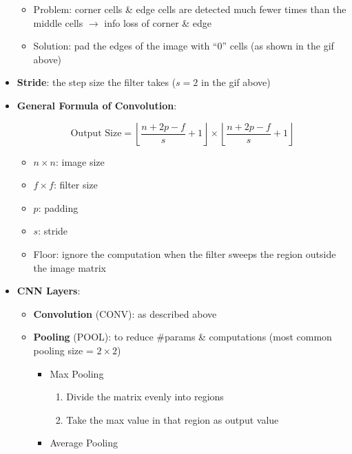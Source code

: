 \documentclass[
]{book}
\providecommand{\tightlist}{%
  \setlength{\itemsep}{0pt}\setlength{\parskip}{0pt}}
\begin{document}
\begin{itemize}
  \begin{itemize}
  \item
    Problem: corner cells \& edge cells are detected much fewer times
    than the middle cells \(\rightarrow\) info loss of corner \& edge
  \item
    Solution: pad the edges of the image with ``0'' cells (as shown in
    the gif above)
  \end{itemize}
\item
  \textbf{Stride}: the step size the filter takes (\(s=2\) in the gif
  above)
\item
  \textbf{General Formula of Convolution}:

  \[\begin{equation}
    \text{Output Size}=\left\lfloor\frac{n+2p-f}{s}+1\right\rfloor\times\left\lfloor\frac{n+2p-f}{s}+1\right\rfloor
    \end{equation}\]

  \begin{itemize}
  \tightlist
  \item
    \(n\times n\): image size
  \item
    \(f\times f\): filter size
  \item
    \(p\): padding
  \item
    \(s\): stride
  \item
    Floor: ignore the computation when the filter sweeps the region
    outside the image matrix\\
  \end{itemize}
\item
  \textbf{CNN Layers}:

  \begin{itemize}
  \item
    \textbf{Convolution} (CONV): as described above
  \item
    \textbf{Pooling} (POOL): to reduce \#params \& computations (most
    common pooling size = \(2\times2\))

    \begin{itemize}
    \item
      Max Pooling

      \begin{enumerate}
      \def\labelenumi{\arabic{enumi}.}
      \tightlist
      \item
        Divide the matrix evenly into regions
      \item
        Take the max value in that region as output value\\
      \end{enumerate}
    \item
      Average Pooling


\end{itemize}
\end{itemize}
\end{itemize}
\end{document}
